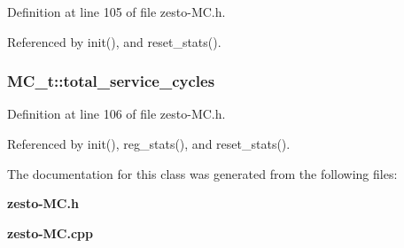 Definition at line 105 of file zesto-MC.h.

Referenced by init(), and reset\_\-stats().
\subsubsection[{total\_\-service\_\-cycles}]{ {\bf MC\_\-t::total\_\-service\_\-cycles}\hspace{0.3cm}{\tt  [protected]}}\label{classMC__t_eaaf4853fc9fce93cfa76bb4ae73ad82}




Definition at line 106 of file zesto-MC.h.

Referenced by init(), reg\_\-stats(), and reset\_\-stats().

The documentation for this class was generated from the following files:\begin{CompactItemize}
\item 
{\bf zesto-MC.h}\item 
{\bf zesto-MC.cpp}\end{CompactItemize}
